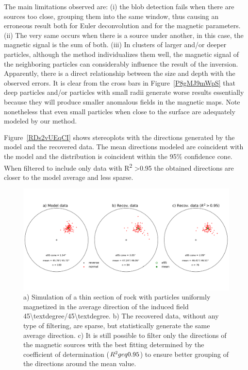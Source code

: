 The main limitations observed are: (i) the blob detection fails when there are
sources too close, grouping them into the same window, thus causing an
erroneous result both for Euler deconvolution and for the magnetic parameters.
(ii) The very same occurs when there is a source under another, in this case,
the magnetic signal is the sum of both. (iii) In clusters of larger and/or
deeper particles, although the method individualizes them well, the magnetic
signal of the neighboring particles can considerably influence the result of
the inversion. Apparently, there is a direct relationship between the size and
depth with the observed errors. It is clear from the cross bars in
Figure~\ref{P8gMJ9mWpS} that deep particles and/or particles with small radii
generate worse results essentially because they will produce smaller anomalous
fields in the magnetic maps. Note nonetheless that even small particles when
close to the surface are adequately modeled by our method.

Figure~\ref{RDs2vUEqCI} shows stereoplots with the directions generated by the
model and the recovered data. The mean directions modeled are coincident with
the model and the distribution is coincident within the 95\% confidence cone.
When filtered to include only data with R\textsuperscript{2} \textgreater 0.95
the obtained directions are closer to the model average and less sparse.

\begin{figure}[!htbp]
\centering
\includegraphics[width=1\linewidth]{figures/ComplexStereo.png}
\caption{
a) Simulation of a thin section of rock with particles uniformly magnetized in
the average direction of the induced field
45{\textbackslash}textdegree/45{\textbackslash}textdegree. b) The recovered
data, without any type of filtering, are sparse, but statistically generate the
same average direction. c) It is still possible to filter only the directions
of the magnetic sources with the best fitting determined by the coefficient of
determination ($R^ 2 \\geq 0.95$) to ensure better grouping of the directions
around the mean value.
}
\label{rds2vueqci}
\end{figure}



